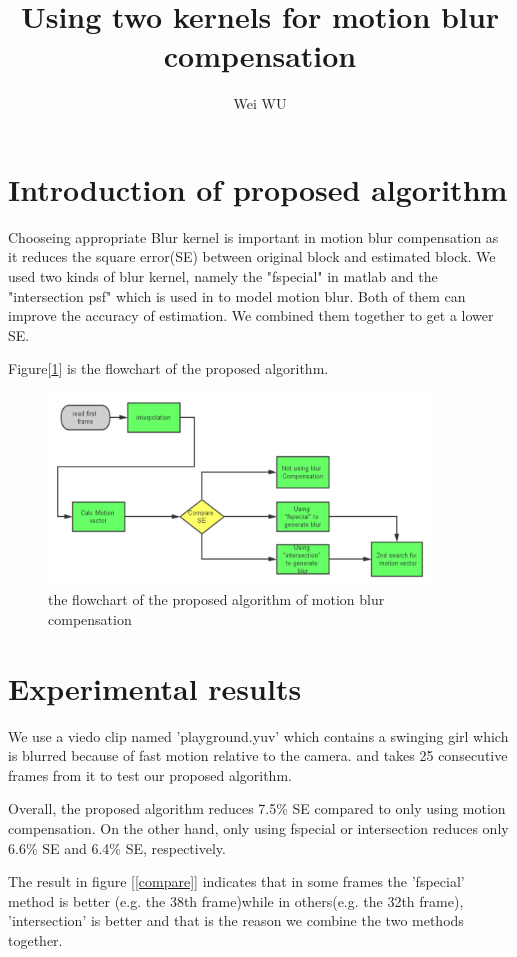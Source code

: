 \documentclass{article}
\title{Using two kernels for motion blur compensation}
\author{Wei WU}
\begin{document}
 
\maketitle{}
 
\section{Introduction of proposed algorithm}
 

Chooseing appropriate Blur kernel is important in motion blur compensation as it reduces the square error(SE) between original block and estimated block. We used two kinds of blur kernel, namely the "fspecial" in matlab and the "intersection psf" which is used in \cite{intersection} to model motion blur. Both of them can improve the accuracy of estimation. We combined them together to get a lower SE.

Figure[\ref{flow}] is the flowchart of the proposed algorithm.

\begin{figure}
   \centering
   \includegraphics[width=4in]{flowc.pdf} 
   \caption{the flowchart of the proposed algorithm of motion blur compensation}
   \label{flow}
\end{figure}

\section{Experimental results}


We use a viedo clip named 'playground.yuv' which contains a swinging girl which is blurred because of fast motion relative to the camera. and takes 25 consecutive frames from it to test our proposed algorithm. 

Overall, the proposed algorithm reduces 7.5\% SE compared to only using motion compensation. On the other hand, only using fspecial or intersection reduces only 6.6\% SE and 6.4\% SE, respectively.

The result in figure [\ref{compare}] indicates that in some frames the 'fspecial' method is better (e.g. the 38th frame)while in others(e.g. the 32th frame), 'intersection' is better and that is the reason we combine the two methods together.
\end{document}
